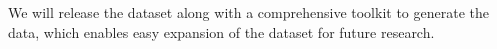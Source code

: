 We will release the dataset along with a comprehensive toolkit to generate the data, which enables easy expansion of the dataset for future research.








